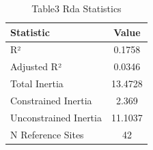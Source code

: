 
\begin{table}[htbp]
    \centering
    \small
    \caption{Table3 Rda Statistics}
    \label{tab:table3_rda_statistics}
    \begin{tabular}{lc}
        \toprule
        Statistic & Value \\
        \midrule
        R² & 0.1758 \\
        Adjusted R² & 0.0346 \\
        Total Inertia & 13.4728 \\
        Constrained Inertia & 2.369 \\
        Unconstrained Inertia & 11.1037 \\
        N Reference Sites & 42 \\
        \bottomrule
    \end{tabular}
\end{table}
